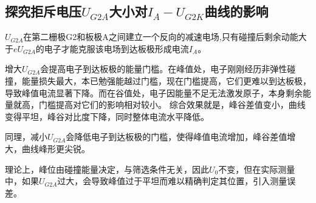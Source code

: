 \documentclass[]{../../templates/Report}%
\begin{document}
\begin{fullreportonly}
\subsection{探究拒斥电压$U_{G2A}$大小对$I_A-U_{G2K}$曲线的影响}
$U_{G2A}$在第二栅极G2和板极A之间建立一个反向的减速电场,只有碰撞后剩余动能大于$eU_{G2A}$的电子才能克服该电场到达板极形成电流$I_A$。
\par
增大$U_{G2A}$会提高电子到达板极的能量门槛。在峰值处，电子刚刚经历非弹性碰撞，能量损失最大，本已勉强能越过门槛，现在门槛提高，它们更难以到达板极，导致峰值电流显著下降。而在谷值处，电子因能量不足无法激发原子，本身剩余能量就高，门槛提高对它们的影响相对较小。
综合效果就是，峰谷差值变小，曲线变得平坦，峰谷对比度下降，同时整体电流水平降低。
\par
同理，减小$U_{G2A}$会降低电子到达板极的门槛，使得峰值电流增加，峰谷差值增大，曲线峰形更尖锐。
\par
理论上，峰位由碰撞能量决定，与筛选条件无关，因此$U_0$不变，但在实际测量中，如果$U_{G2A}$过大，会导致峰值过于平坦而难以精确判定其位置，引入测量误差。
\end{fullreportonly}
\newpage
\insertnotes
\end{document}
